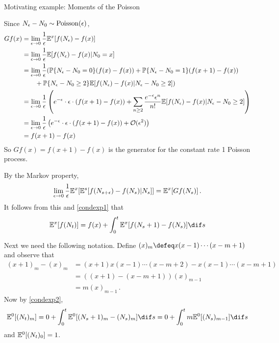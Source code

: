 \documentclass[../../../Master/AppliedStochastics.tex]{subfiles}
\begin{document}
\begin{example}{Motivating example: Moments of the Poisson}
    
    Since $N_\epsilon - N_0 \sim \operatorname{Poisson}(\epsilon)$, 
    $$\begin{aligned}
        Gf(x) &= \lim_{\epsilon \to 0} \frac{1}{\epsilon}
                    \mathbb{E}^{x} [f(N_\epsilon) - f(x)] \\
              &= \lim_{\epsilon \to 0} \frac{1}{\epsilon}
                    \mathbb{E}[f(N_\epsilon) - f(x) | N_0 = x] \\
              &= \lim_{\epsilon \to 0}  \frac{1}{\epsilon}
                    (\mathbb{P} \{ N_\epsilon - N_0 = 0 \} ( f(x) - f(x) ) +
                    \mathbb{P} \{ N_\epsilon - N_0 = 1 \} ( f(x+1) - f(x) ) \\
              &\qquad + \mathbb{P} \{ N_\epsilon - N_0 \geq 2 \} \mathbb{E}[f(N_\epsilon)
                      - f(x) | N_\epsilon - N_0 \geq 2 ] ) \\
              &= \lim_{\epsilon \to 0}  \frac{1}{\epsilon}
                    \left( e^{-\epsilon} \cdot \epsilon \cdot (f(x+1) - f(x)) + \sum_{n \geq 2} \dfrac{e^{-\epsilon} \epsilon^n}{n!}
                        \mathbb{E}[f(N_\epsilon) - f(x) | N_\epsilon - N_0 \geq 2 ]
                    \right) \\
              &= \lim_{\epsilon \to 0} \frac{1}{\epsilon} 
                    \left( e^{-\epsilon} \cdot \epsilon \cdot (f(x+1) - f(x)) +
                         \mathcal{O}(\epsilon^2) \right) \\
              & = f(x+1) - f(x)
    \end{aligned}$$
    So $Gf(x) = f(x + 1) - f(x)$ is the generator
        for the constant rate 1 Poisson process. 
     
    By the Markov property, 
    $$\begin{aligned}
        \lim_{\epsilon \to 0} \frac{1}{\epsilon}
            \mathbb{E}^x [ \mathbb{E}^s [f(N_{s+\epsilon}) - f(N_s) | N_s] ] = \mathbb{E}^x[Gf(N_s)]\,.
    \end{aligned}$$
    It follows from this and \eqref{condexp1} that
    $$\begin{aligned}\label{condexp2}
        \E^x[f(N_t)] = f(x) + \int_0^t \E^x [f(N_s + 1) - f(N_s) ] \dif s
    \end{aligned}$$
    
     
    Next we need the following notation.
    Define $(x)_m \defeq x(x-1) \cdots (x-m+1)$ and observe that 
    $$\begin{aligned}
        (x+1)_m - (x)_m
            &= (x+1) x (x-1) \cdots (x-m+2) - x (x-1) \cdots (x-m+1)\\
            &= ( (x+1) - (x-m+1) ) (x)_{m-1} \\
            &= m (x)_{m-1}\,.
    \end{aligned}$$
    Now by \eqref{condexp2},
    $$\begin{aligned}
        \E^0 [ (N_t)_m ] = 0 + \int_0^{t} \E^{0} [(N_s+1)_m - (N_s)_{m}] \dif s
                         = 0 + \int_0^{t} m \E^{0} [(N_s)_{m-1}] \dif s 
    \end{aligned}$$
        and $\mathbb{E}^0 [ (N_t)_0 ] = 1$. 
    

\end{example}
\end{document}
